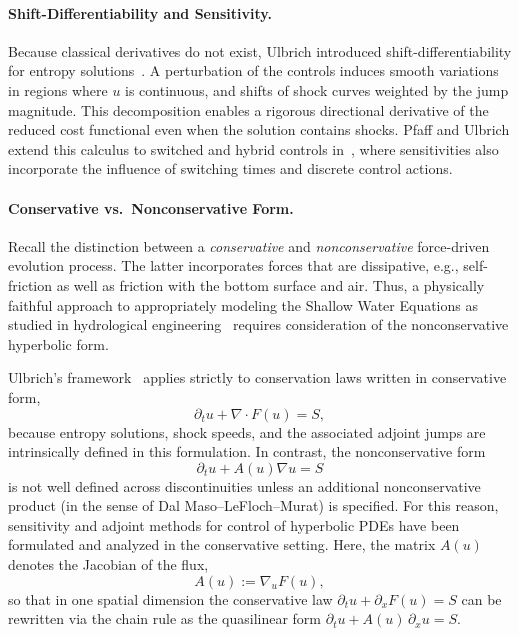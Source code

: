\documentclass{article}
\newcommand{\1}{\mathds{1}}          %
\theoremstyle{definition}
\begin{document}
\begin{sloppypar}
\paragraph{Shift-Differentiability and Sensitivity.} Because classical derivatives do not exist, Ulbrich introduced shift-differentiability for entropy solutions~\cite{ulbrichpdeopthyper}.  
A perturbation of the controls induces smooth variations in regions where $u$ is continuous, and shifts of shock curves weighted by the jump magnitude. This decomposition enables a rigorous directional derivative of the reduced cost functional even
when the solution contains shocks. Pfaff and Ulbrich extend this calculus to switched and hybrid
controls in~\cite{PfaffUlbrichTLP,Sulb2016}, where sensitivities also incorporate the influence of
switching times and discrete control actions.

\paragraph{Conservative vs.\ Nonconservative Form.}
Recall the distinction between a \emph{conservative} and \emph{nonconservative} force-driven evolution process. The latter incorporates forces that are dissipative, e.g., self-friction as well as friction with the bottom surface and air. Thus, a physically faithful approach to appropriately modeling the Shallow Water Equations as studied in hydrological engineering~\cite{castro2019shallow} requires consideration of the nonconservative hyperbolic form. 

Ulbrich’s framework~\cite{ulbrichpdeopthyper} applies strictly to conservation laws written in
conservative form,
\[
\partial_t u + \nabla\!\cdot F(u)=S,
\]
because entropy solutions, shock speeds, and the associated adjoint jumps are intrinsically defined
in this formulation.  
In contrast, the nonconservative form
\[
\partial_t u + A(u)\nabla u = S
\]
is not well defined across discontinuities unless an additional nonconservative product (in the
sense of Dal Maso--LeFloch--Murat) is specified.  For this reason, sensitivity and adjoint methods for control of hyperbolic PDEs have been formulated and
analyzed in the conservative setting. Here, the matrix $A(u)$ denotes the Jacobian of the flux,
\[
A(u) := \nabla_u F(u),
\]
so that in one spatial dimension the conservative law  $\partial_t u + \partial_x F(u) = S$ can be rewritten via the chain rule as the quasilinear form $\partial_t u + A(u)\,\partial_x u = S$.


\end{sloppypar}
\end{document}
